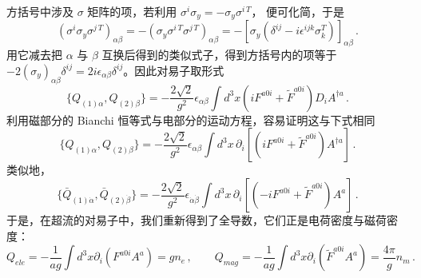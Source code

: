 方括号中涉及 $\sigma$ 矩阵的项，若利用 $\sigma^i\sigma_y=-\sigma_y\sigma^{i\,T}$，
便可化简，于是
$$
(\sigma^i\sigma_y\sigma^{j\,T})_{\alpha\beta}=-(\sigma_y\sigma^{i\,T} 
\sigma^{j\,T})_{\alpha\beta}=-[\sigma_y(\delta^{ij}-i\epsilon^{ijk}
\sigma_k^T)]_{\alpha\beta} \,.
$$
用它减去把 $\alpha$ 与 $\beta$ 互换后得到的类似式子，得到方括号内的项等于
$-2(\sigma_y)_{\alpha\beta}\delta^{ij}=2i\epsilon_{\alpha\beta}
\delta^{ij}$。因此对易子取形式
$$
\{Q_{(1)\alpha},Q_{(2)\beta}\}=-\frac{2\sqrt{2}}{g^2}
\epsilon_{\alpha\beta}\int d^3x (iF^{a0i}+\widetilde F^{a0i}) 
D_i A^{\dagger a} \,.
$$
利用磁部分的 Bianchi 恒等式与电部分的运动方程，容易证明这与下式相同
$$
\{Q_{(1)\alpha},Q_{(2)\beta}\}=-\frac{2\sqrt{2}}{g^2}
\epsilon_{\alpha \beta}\int d^3x\,\partial_i\left[(iF^{a0i}+
\widetilde F^{a0i}) A^{\dagger a}\right] \,.
$$
类似地，
$$
\{\bar Q_{(1)\dot{\alpha}},\bar Q_{(2)\dot{\beta}}\}=-\frac
{2\sqrt{2}}{g^2} \epsilon_{\dot{\alpha}\dot{\beta}} \int d^3 x\,
\partial_i \left[(-iF^{a0i}+\widetilde F^{a0i}) A^a \right]\,.
$$
于是，在超流的对易子中，我们重新得到了全导数，它们正是电荷密度与磁荷密度：
$$
Q_{ele}=-\frac{1}{ag}\int d^3x \partial_i(F^{a0i} A^a)= gn_e\,,\qquad 
Q_{mag}=-\frac{1}{ag}\int d^3x \partial_i(\widetilde F^{a0i} A^a)=
\frac{4\pi}{g}n_m \,.
$$
